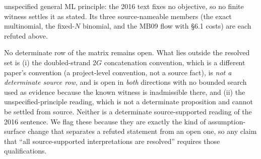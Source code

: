 \begin{remark}
\begin{itemize}
    unspecified general ML principle: the 2016 text fixes no objective, so no
    finite witness settles it as stated. Its three source-nameable members (the
    exact multinomial, the fixed-$N$ binomial, and the MB09 flow with §6.1
    costs) are each refuted above.
\end{itemize}
No determinate row of the matrix remains open. What lies outside the resolved set
is (i) the doubled-strand $2G$ concatenation convention, which is a different
paper's convention (a project-level convention, not a source fact), is
\emph{not a determinate source row}, and is open in \emph{both} directions with
no bounded search used as evidence because the known witness is inadmissible
there, and (ii) the unspecified-principle reading, which is not a determinate
proposition and cannot be settled from source. Neither is a determinate
source-supported reading of the 2016 sentence. We flag these because they are
exactly the kind of assumption-surface change that separates a refuted
statement from an open one, so any claim that ``all source-supported interpretations are resolved''
requires those qualifications.
\end{remark}

